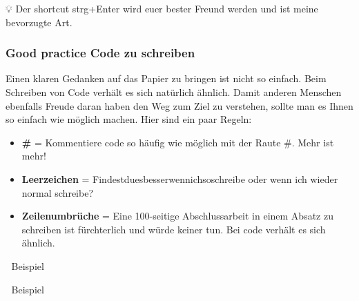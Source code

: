 \documentclass[
]{article}
\newenvironment{Shaded}{\begin{snugshade}}{\end{snugshade}}
\newcommand{\AttributeTok}[1]{\textcolor[rgb]{0.77,0.63,0.00}{#1}}
\newcommand{\FunctionTok}[1]{\textcolor[rgb]{0.00,0.00,0.00}{#1}}
\newcommand{\NormalTok}[1]{#1}
\newcommand{\OtherTok}[1]{\textcolor[rgb]{0.56,0.35,0.01}{#1}}
\newcommand{\SpecialCharTok}[1]{\textcolor[rgb]{0.00,0.00,0.00}{#1}}
\newcommand{\StringTok}[1]{\textcolor[rgb]{0.31,0.60,0.02}{#1}}
\providecommand{\tightlist}{%
  \setlength{\itemsep}{0pt}\setlength{\parskip}{0pt}}
\begin{document}
💡 Der shortcut strg+Enter wird euer bester Freund werden und ist meine bevorzugte Art.

\hypertarget{good-practice-code-zu-schreiben}{%
\subsubsection{Good practice Code zu schreiben}\label{good-practice-code-zu-schreiben}}

Einen klaren Gedanken auf das Papier zu bringen ist nicht so einfach. Beim Schreiben von Code verhält es sich natürlich ähnlich. Damit anderen Menschen ebenfalls Freude daran haben den Weg zum Ziel zu verstehen, sollte man es Ihnen so einfach wie möglich machen. Hier sind ein paar Regeln:

\begin{itemize}
\tightlist
\item
  \textbf{\#} = Kommentiere code so häufig wie möglich mit der Raute \#. Mehr ist mehr!
\item
  \textbf{Leerzeichen} = Findestduesbesserwennichsoschreibe oder wenn ich wieder normal schreibe?
\item
  \textbf{Zeilenumbrüche} = Eine 100-seitige Abschlussarbeit in einem Absatz zu schreiben ist fürchterlich und würde keiner tun. Bei code verhält es sich ähnlich.
\end{itemize}

💩 Beispiel

\begin{Shaded}
\end{Shaded}

💪 Beispiel
\end{document}
